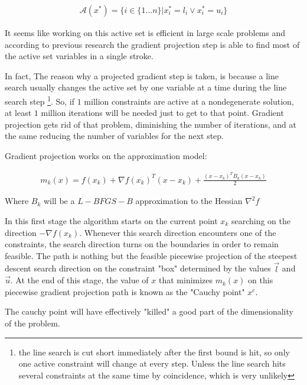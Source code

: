 \begin{equation}
  \begin{aligned}
    \mathcal{A}(x^*) = \{ i \in \{1 \ldots n\} |  x^*_i = l_i \vee  x^*_i = u_i\}
  \end{aligned}
\end{equation}

It seems like working on this active set is efficient in large scale problems and according to previous research \citep{nocedal} the gradient projection step is able to find most of the active set variables in a single stroke. 

In fact, The reason why a projected gradient step is taken, is because a line search usually changes the active set by one variable at a time during the line search step \footnote{the line search is cut short immediately after the first bound is hit, so only one active constraint will change at every step. Unless the line search hits several constraints at the same time by coincidence, which is very unlikely}. So, if $1$ million constraints are active at a nondegenerate solution, at least $1$ million iterations will be needed just to get to that point.  Gradient projection gets rid of that problem, diminishing the number of iterations, and at the same reducing the number of variables for the next step.

Gradient projection works on the approximation model:

\begin{equation} \label{themodel}
  \begin{aligned}
    m_k(x) = f(x_k) + \nabla f(x_k)^T ( x - x_k) + \frac{(x - x_k)^T B_k (x - x_k) }{2}
  \end{aligned}
\end{equation}

Where $B_k$ will be a $L-BFGS-B$ approximation to the Hessian $\nabla^2 f$

In this first stage the algorithm starts on the current point $x_k$ searching on the direction $-\nabla f(x_k)$. Whenever this search direction encounters one of the constraints, the search direction turns on the boundaries in order to remain feasible. The path is nothing but the feasible piecewise projection of the steepest descent search direction on the constraint "box" determined by the values $\overrightarrow{l}$ and $\overrightarrow{u}$. At the end of this stage, the value of $x$ that minimizes $m_k(x)$ on this piecewise gradient projection path is known as the "Cauchy point" $x^c$.

The cauchy point will have effectively "killed" a good part of the dimensionality of the problem.

